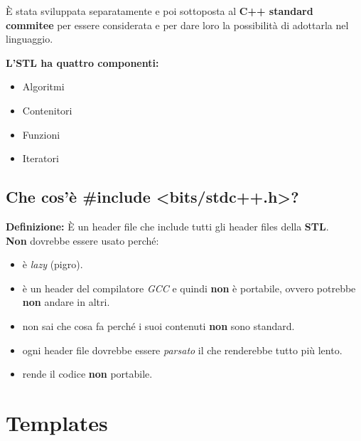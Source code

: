 \textsf{\small È stata sviluppata separatamente e poi sottoposta al \textbf{C++ standard commitee} per essere considerata e per dare loro la possibilità di adottarla nel linguaggio.} \break

\textsf{\small \textbf{L'STL ha quattro componenti: } } \\

\begin{itemize}
	\item \textsf{\small Algoritmi}
	\item \textsf{\small Contenitori}
	\item \textsf{\small Funzioni}
	\item \textsf{\small Iteratori}
\end{itemize}

\subsection{Che cos'è \#include <bits/stdc++.h>?}

\textsf{\small \textbf{Definizione: } È un header file che include tutti gli header files della \textbf{STL}.} \\

\textsf{\small \textbf{Non} dovrebbe essere usato perché: } \\

\begin{itemize}
	\item \textsf{\small è \emph{lazy} (pigro).}
	\item \textsf{\small è un header del compilatore \emph{GCC} e quindi \textbf{non} è portabile, ovvero potrebbe \textbf{non} andare in altri.}
	\item \textsf{\small non sai che cosa fa perché i suoi contenuti \textbf{non} sono standard.}
	\item \textsf{\small ogni header file dovrebbe essere \emph{parsato} il che renderebbe tutto più lento.}
	\item \textsf{\small rende il codice \textbf{non} portabile.}
\end{itemize}


\newpage

\section{Templates}

